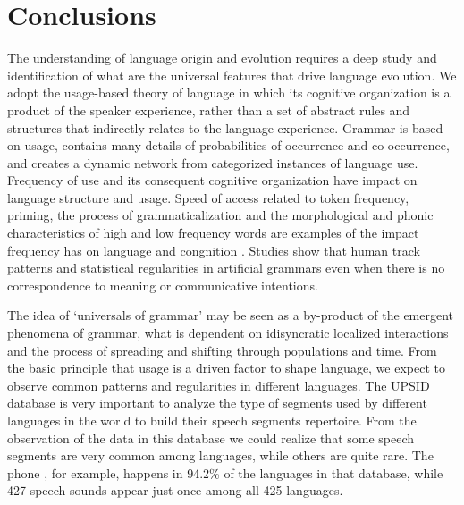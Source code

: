 \chapter{Conclusions}

The understanding of language origin and evolution requires a deep study
and identification of what are the universal features that drive language evolution.
We adopt the usage-based theory of language in which its cognitive organization
is a product of the speaker experience, rather than a set of abstract rules and structures
that indirectly relates to the language experience. Grammar is based on usage, contains
many details of probabilities of occurrence and co-occurrence, and creates a dynamic network
from categorized instances of language use.
Frequency of use and its consequent cognitive organization have impact on language 
structure and usage. Speed of access related to token frequency, priming, the process 
of grammaticalization and the morphological and phonic characteristics of high and low frequency
words are examples of the impact frequency has on language and congnition \citep{bybee2001,bybee2003,bybee2007frequency,ellis2002}.
Studies \citep{saffran1996b,Saffran1999,Saffran2003} show that human track patterns and statistical regularities in artificial
grammars even when there is no correspondence to meaning or communicative intentions.

The idea of `universals of grammar' may be seen as a by-product of the emergent phenomena
of grammar, what is dependent on idisyncratic localized interactions and the
process of spreading and shifting through populations and time.
From the basic principle that usage is a driven factor to shape language, we 
expect to observe common patterns and regularities in different languages.
The UPSID database is very important to analyze the type of segments used by different
languages in the world to build their speech segments repertoire. From the observation
of the data in this database we could realize that some speech segments are very
common among languages, while others are quite rare. The phone \textipa{[m]}, for example,
happens in 94.2\% of the languages in that database, while 427 speech sounds appear just once
among all 425 languages.

